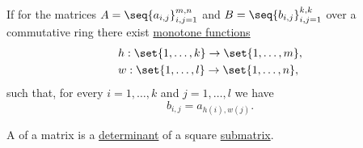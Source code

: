 \begin{definition}\label{def:submatrix}\mimprovised
  If for the matrices \( A = \seq{ a_{i,j} }_{i,j=1}^{m,n} \) and \( B = \seq{ b_{i,j} }_{i,j=1}^{k,k} \) over a commutative ring there exist \hyperref[def:order_homomorphism]{monotone functions}
  \begin{align*}
    &h: \set{ 1, \ldots, k } \to \set{ 1, \ldots, m }, \\
    &w: \set{ 1, \ldots, l } \to \set{ 1, \ldots, n },
  \end{align*}
  such that, for every \( i = 1, \ldots, k \) and \( j = 1, \ldots, l \) we have
  \begin{equation*}
    b_{i,j} = a_{h(i),w(j)}.
  \end{equation*}
\end{definition}

\begin{definition}\label{def:matrix_minor}\mimprovised
  A  of a matrix is a \hyperref[def:matrix_determinant]{determinant} of a square \hyperref[def:submatrix]{submatrix}.
\end{definition}

\medskip

